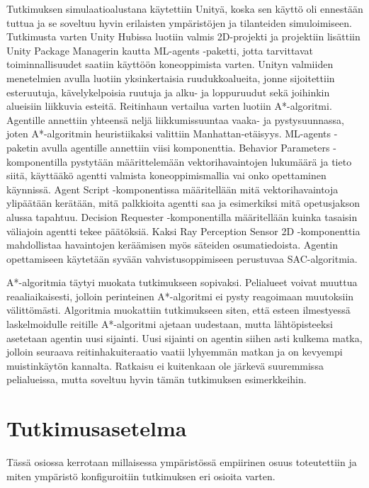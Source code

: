 \documentclass[utf8]{gradu3}
\begin{document}
Tutkimuksen simulaatioalustana käytettiin Unityä, koska sen käyttö oli ennestään tuttua ja se soveltuu hyvin erilaisten ympäristöjen ja tilanteiden simuloimiseen. Tutkimusta varten Unity Hubissa luotiin valmis 2D-projekti ja projektiin lisättiin Unity Package Managerin kautta ML-agents -paketti, jotta tarvittavat toiminnallisuudet saatiin käyttöön koneoppimista varten. Unityn valmiiden menetelmien avulla luotiin yksinkertaisia ruudukkoalueita, jonne sijoitettiin esteruutuja, kävelykelpoisia ruutuja ja alku- ja loppuruudut sekä joihinkin alueisiin liikkuvia esteitä. Reitinhaun vertailua varten luotiin A*-algoritmi. Agentille annettiin yhteensä neljä liikkumissuuntaa vaaka- ja pystysuunnassa, joten A*-algoritmin heuristiikaksi valittiin Manhattan-etäisyys. ML-agents -paketin avulla agentille annettiin viisi komponenttia. Behavior Parameters -komponentilla pystytään määrittelemään vektorihavaintojen lukumäärä ja tieto siitä, käyttääkö agentti valmista koneoppimismallia vai onko opettaminen käynnissä. Agent Script -komponentissa määritellään mitä vektorihavaintoja ylipäätään kerätään, mitä palkkioita agentti saa ja esimerkiksi mitä opetusjakson alussa tapahtuu. Decision Requester -komponentilla määritellään kuinka tasaisin väliajoin agentti tekee päätöksiä. Kaksi Ray Perception Sensor 2D -komponenttia mahdollistaa havaintojen keräämisen myös säteiden osumatiedoista. Agentin opettamiseen käytetään syvään vahvistusoppimiseen perustuvaa SAC-algoritmia.

A*-algoritmia täytyi muokata tutkimukseen sopivaksi. Pelialueet voivat muuttua reaaliaikaisesti, jolloin perinteinen A*-algoritmi ei pysty reagoimaan muutoksiin välittömästi. Algoritmia muokattiin tutkimukseen siten, että esteen ilmestyessä laskelmoidulle reitille A*-algoritmi ajetaan uudestaan, mutta lähtöpisteeksi asetetaan agentin uusi sijainti. Uusi sijainti on agentin siihen asti kulkema matka, jolloin seuraava reitinhakuiteraatio vaatii lyhyemmän matkan ja on kevyempi muistinkäytön kannalta. Ratkaisu ei kuitenkaan ole järkevä suuremmissa pelialueissa, mutta soveltuu hyvin tämän tutkimuksen esimerkkeihin.

\section{Tutkimusasetelma}
\label{sec:tutkimusasetelma}

Tässä osiossa kerrotaan millaisessa ympäristössä empiirinen osuus toteutettiin ja miten ympäristö konfiguroitiin tutkimuksen eri osioita varten.
\end{document}
